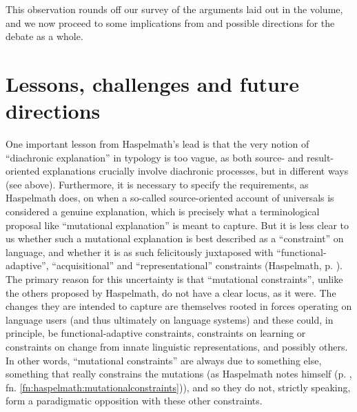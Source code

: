 \documentclass[output=paper]{langsci/langscibook}
\begin{document}
This observation rounds off our survey of the arguments laid out in the volume, and we now proceed to some implications from and possible  directions for the debate as a whole.

\section{Lessons, challenges and future directions}\label{sec:epilogue:2}

One important  lesson from Haspelmath’s lead  is that the very notion of “diachronic explanation” in typology is too vague, as both source- and result-oriented explanations crucially involve diachronic processes, but in different ways (see  above). Furthermore, it is necessary to specify the requirements, as Haspelmath does, on when a so-called source-oriented account of universals is considered a genuine explanation, which is precisely what a terminological proposal like “mutational explanation” is meant to capture. But it is less clear to us whether such a mutational explanation is best described as a “constraint” on language, and whether it is as such felicitously juxtaposed with “functional-adaptive”, “acquisitional” and “representational” constraints (Haspelmath, p. \pageref{p:haspelmath:representationalconstraints}). The primary reason for this uncertainty is that “mutational constraints”, unlike the others proposed by Haspelmath, do not have a clear locus, as it were. The changes they are intended to capture are themselves rooted in forces operating on language users (and thus ultimately on language systems) and these could, in principle, be functional-adaptive constraints, constraints on learning or constraints on change from innate linguistic representations, and possibly others. In other words, “mutational constraints” are always due to something else, something that really constrains the mutations (as Haspelmath notes himself (p. \pageref{fn:haspelmath:mutationalconstraints}, fn. \ref{fn:haspelmath:mutationalconstraints})), and so they do not, strictly speaking, form a paradigmatic opposition with these other constraints.
\end{document}
